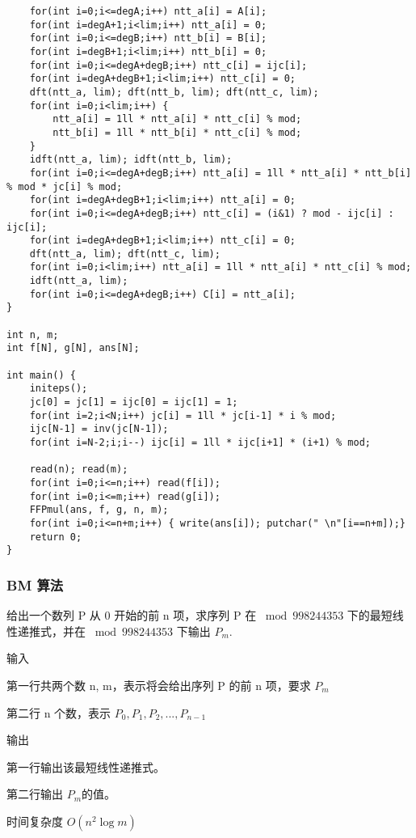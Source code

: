 \documentclass[UTF8]{ctexart}
\begin{document}
\begin{framed}
\begin{lstlisting}
    for(int i=0;i<=degA;i++) ntt_a[i] = A[i];
    for(int i=degA+1;i<lim;i++) ntt_a[i] = 0;
    for(int i=0;i<=degB;i++) ntt_b[i] = B[i];
    for(int i=degB+1;i<lim;i++) ntt_b[i] = 0;
    for(int i=0;i<=degA+degB;i++) ntt_c[i] = ijc[i];
    for(int i=degA+degB+1;i<lim;i++) ntt_c[i] = 0;
    dft(ntt_a, lim); dft(ntt_b, lim); dft(ntt_c, lim);
    for(int i=0;i<lim;i++) {
        ntt_a[i] = 1ll * ntt_a[i] * ntt_c[i] % mod;
        ntt_b[i] = 1ll * ntt_b[i] * ntt_c[i] % mod;
    }
    idft(ntt_a, lim); idft(ntt_b, lim);
    for(int i=0;i<=degA+degB;i++) ntt_a[i] = 1ll * ntt_a[i] * ntt_b[i] % mod * jc[i] % mod;
    for(int i=degA+degB+1;i<lim;i++) ntt_a[i] = 0;
    for(int i=0;i<=degA+degB;i++) ntt_c[i] = (i&1) ? mod - ijc[i] : ijc[i];
    for(int i=degA+degB+1;i<lim;i++) ntt_c[i] = 0;
    dft(ntt_a, lim); dft(ntt_c, lim);
    for(int i=0;i<lim;i++) ntt_a[i] = 1ll * ntt_a[i] * ntt_c[i] % mod;
    idft(ntt_a, lim);
    for(int i=0;i<=degA+degB;i++) C[i] = ntt_a[i];
}

int n, m;
int f[N], g[N], ans[N];

int main() {
    initeps();
    jc[0] = jc[1] = ijc[0] = ijc[1] = 1;
    for(int i=2;i<N;i++) jc[i] = 1ll * jc[i-1] * i % mod;
    ijc[N-1] = inv(jc[N-1]);
    for(int i=N-2;i;i--) ijc[i] = 1ll * ijc[i+1] * (i+1) % mod;

    read(n); read(m);
    for(int i=0;i<=n;i++) read(f[i]);
    for(int i=0;i<=m;i++) read(g[i]);
    FFPmul(ans, f, g, n, m);
    for(int i=0;i<=n+m;i++) { write(ans[i]); putchar(" \n"[i==n+m]);}
    return 0;
}
\end{lstlisting}
\end{framed}

\subsubsection{BM 算法}

给出一个数列 P 从 0 开始的前 n 项，求序列 P 在 $\bmod 998244353$  下的最短线性递推式，并在 $\bmod 998244353$ 下输出 $P_m$.

输入

第一行共两个数 n, m，表示将会给出序列 P 的前 n 项，要求 $P_m$

第二行 n 个数，表示 $P_0, P_1, P_2, ..., P_{n-1}$

输出

第一行输出该最短线性递推式。

第二行输出 $P_m$​ 的值。

时间复杂度 $O(n^2 \log m)$
\end{document}
